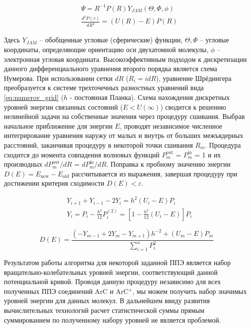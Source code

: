 \documentclass[12pt]{extarticle}
\begin{document}
 	\begin{equation} \label{eq:rad_shred}
		\begin{split}
			&\Psi=R^{-1} P(R) Y_{J \Lambda M}(\Theta, \Phi, \phi) \\
			& \frac{d^2 P(r)}{ d R^2} =(U(R)-E) P(R)
		\end{split}
	\end{equation}
	
	Здесь $Y_{J \Lambda M}$ -- обобщенные угловые (сферические) функции, $\Theta, \Phi$ -- угловые координаты, определяющие ориентацию оси двухатомной молекулы, $\phi$ -- электронная угловая координата. Высокоэффективным подходом к дискретизации данного дифференциального уравнения второго порядка является схема Нумерова. При использовании сетки $dR$ ($R_i = i  dR$), уравнение Шрёдингера преобразуется к системе трехточечных разностных уравнений вида \ref{eq:numerov_grid} ($h$ - постоянная Планка). Схема нахождения дискретных уровней энергии связанных состояний ($E < U(\infty)$) сводится к решению нелинейной задачи на собственные значения через процедуру сшивания. Выбрав начальное приближение для энергии $E$, проводят независимое численное интегрирование уравнения наружу от малых и внутрь от больших межъядерных расстояний, заканчивая процедуру в некоторой точки сшивания $R_m$. Процедура сходится до момента совпадения волновых функций $P_m^{\text{out}}$ = $P_m^{\text{in}}$ = 1 и их производных $dP_m^{\text{out}}/dR$ = $dP_m^{\text{in}}/dR$. Поправка к пробному значению энергии $D(E) = E_\text{new} - E_\text{old}$ рассчитывается из выражения, завершая процедуру при достижении критерия сходимости $D(E) < \varepsilon$.
	
    \begin{equation} \label{eq:numerov_grid}
		\begin{split}
			&Y_{i+1}+Y_{i-1}-2 Y_i=h^2\left(U_i-E\right) P_i \\
			&Y_i=P_i-\frac{h^2}{12} P_i^{(2)}=\left[1-\frac{h^2}{12}\left(U_i-E\right)\right] P_i
		\end{split}
	\end{equation}
	
    \begin{equation} \label{eq:energy_buff}
		D(E)=\frac{\left(-Y_{m-1}+2 Y_m-Y_{m+1}\right) h^{-2}+\left(U_m-E\right) P_m}{\sum_{i=1}^n P_i^2}
	\end{equation}
    
    Результатом работы алгоритма для некоторой заданной ППЭ является набор вращательно-колебательных уровней энергии, соответствующий данной потенциальной кривой. Проводя данную процедуру независимо для всех полученных ППЭ соединений ArC и ArC$^+$, мы можем получить набор значимых уровней энергии для данных молекул. В дальнейшем ввиду развития вычислительных технологий расчет статистической суммы прямым суммированием по полученному набору уровней не является проблемой.
    
\end{document}
